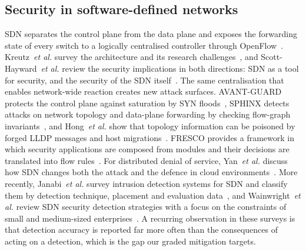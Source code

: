 \documentclass[conference]{IEEEtran}
\begin{document}
\subsection{Security in software-defined networks}
SDN separates the control plane from the data plane and exposes the forwarding state of every switch to a logically
centralised controller through OpenFlow~\cite{mckeown2008openflow,onf2009of10}. Kreutz~\emph{et al.} survey the
architecture and its research challenges~\cite{kreutz2015sdn}, and Scott-Hayward~\emph{et al.} review the security
implications in both directions: SDN as a tool for security, and the security of the SDN itself~\cite{scotthayward2016survey}.
The same centralisation that enables network-wide reaction creates new attack surfaces. AVANT-GUARD protects the control
plane against saturation by SYN floods~\cite{shin2013avantguard}, SPHINX detects attacks on network topology and data-plane
forwarding by checking flow-graph invariants~\cite{dhawan2015sphinx}, and Hong~\emph{et al.} show that topology
information can be poisoned by forged LLDP messages and host migrations~\cite{hong2015poisoning}. FRESCO provides a
framework in which security applications are composed from modules and their decisions are translated into flow
rules~\cite{shin2013fresco}. For distributed denial of service, Yan~\emph{et al.} discuss how SDN changes both the attack
and the defence in cloud environments~\cite{yan2016ddos}. More recently, Janabi~\emph{et al.} survey intrusion detection
systems for SDN and classify them by detection technique, placement and evaluation data~\cite{janabi2024survey}, and
Wainwright~\emph{et al.} review SDN security detection strategies with a focus on the constraints of small and medium-sized
enterprises~\cite{wainwright2025sdn}. A recurring observation in these surveys is that detection accuracy is reported far
more often than the consequences of acting on a detection, which is the gap our graded mitigation targets.
\end{document}
